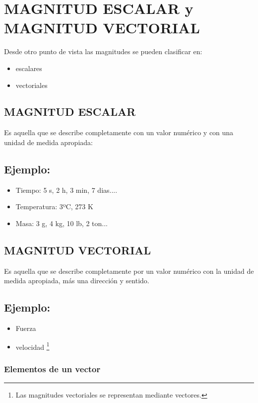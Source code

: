 \documentclass[12pt]{article}
\begin{document}
 
\section{MAGNITUD ESCALAR y MAGNITUD VECTORIAL}
Desde otro punto de vista las magnitudes se pueden clasificar en:
\begin{itemize}
    \item{escalares} 
\item vectoriales 
\end{itemize}
\subsection{MAGNITUD ESCALAR}
 Es aquella que se describe completamente con un valor numérico y con una unidad de medida apropiada: 
 \subsection*{Ejemplo:} 
 \begin{itemize}
     \item Tiempo: 5 s, 2 h, 3 min, 7 dias....
     \item Temperatura: 3ºC, 273 K
     \item Masa: 3 g, 4 kg, 10 lb, 2 ton...
 \end{itemize}
 
 \subsection{MAGNITUD VECTORIAL}
 Es aquella que se describe completamente por un valor numérico con la unidad de medida apropiada, más una dirección y sentido. 
 \subsection*{Ejemplo:}
 \begin{itemize}
     \item Fuerza
     \item velocidad \footnote{Las magnitudes vectoriales se representan mediante vectores. }
 \end{itemize}
 

\subsubsection{Elementos de un vector }
\end{document}
